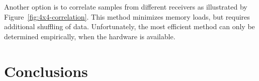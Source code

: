 \documentclass{article}
\begin{document}
Another option is to correlate samples from different receivers as illustrated
by Figure~\ref{fig:4x4-correlation}.
This method minimizes memory loads, but requires additional shuffling of data.
Unfortunately, the most efficient method can only be determined empirically,
when the hardware is available.

\section{Conclusions}




\end{document}
